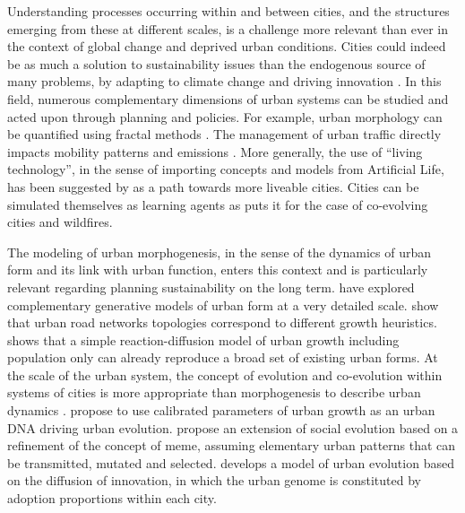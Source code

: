 \documentclass[letterpaper]{article}
\begin{document}
Understanding processes occurring within and between cities, and the structures emerging from these at different scales, is a challenge more relevant than ever in the context of global change and deprived urban conditions. Cities could indeed be as much a solution to sustainability issues than the endogenous source of many problems, by adapting to climate change and driving innovation \citep{pumain2020theories}. In this field, numerous complementary dimensions of urban systems can be studied and acted upon through planning and policies. For example, urban morphology can be quantified using fractal methods \citep{chen2010modeling}. The management of urban traffic directly impacts mobility patterns and emissions \citep{yoshioka2017macroscopic}. More generally, the use of ``living technology'', in the sense of importing concepts and models from Artificial Life, has been suggested by \cite{gershenson2013living} as a path towards more liveable cities. Cities can be simulated themselves as learning agents as \cite{goldstein2000cities} puts it for the case of co-evolving cities and wildfires.

The modeling of urban morphogenesis, in the sense of the dynamics of urban form and its link with urban function, enters this context and is particularly relevant regarding planning sustainability on the long term. \cite{raimbault2019generating} have explored complementary generative models of urban form at a very detailed scale. \cite{raimbault2018multi} show that urban road networks topologies correspond to different growth heuristics. \cite{raimbault2018calibration} shows that a simple reaction-diffusion model of urban growth including population only can already reproduce a broad set of existing urban forms. At the scale of the urban system, the concept of evolution and co-evolution within systems of cities is more appropriate than morphogenesis to describe urban dynamics \citep{pumain2018evolutionary}. \cite{wu2011urban} propose to use calibrated parameters of urban growth as an urban DNA driving urban evolution. \cite{silver2019towards} propose an extension of social evolution based on a refinement of the concept of meme, assuming elementary urban patterns that can be transmitted, mutated and selected. \cite{raimbault2020model} develops a model of urban evolution based on the diffusion of innovation, in which the urban genome is constituted by adoption proportions within each city.
\end{document}
